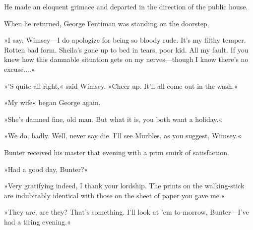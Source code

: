 He made an eloquent grimace and departed in the direction of the public house.

When he returned, George Fentiman was standing on the doorstep.

»I say, Wimsey\allowbreak---\allowbreak I do apologize for being so bloody rude. It's my filthy temper. Rotten bad form. Sheila's gone up to bed in tears, poor kid. All my fault. If you knew how this damnable situation gets on my nerves\allowbreak---\allowbreak though I know there's no excuse....«

»'S quite all right,« said Wimsey. »Cheer up. It'll all come out in the wash.«

»My wife\longdash« began George again.

»She's damned fine, old man. But what it is, you both want a holiday.«

»We do, badly. Well, never say die. I'll see Murbles, as you suggest, Wimsey.«

Bunter received his master that evening with a prim smirk of satisfaction.

»Had a good day, Bunter?«

»Very gratifying indeed, I thank your lordship. The prints on the walking-stick are indubitably identical with those on the sheet of paper you gave me.«

»They are, are they? That's something. I'll look at 'em to-morrow, Bunter\allowbreak---\allowbreak I've had a tiring evening.«